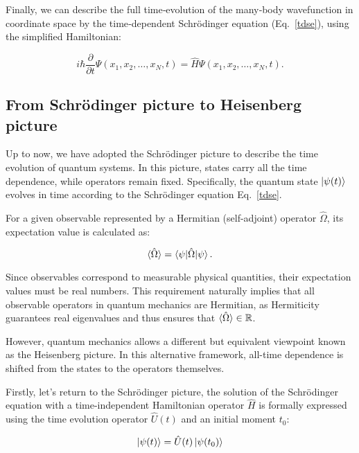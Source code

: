 Finally, we can describe the full time‐evolution of the many‐body wavefunction in coordinate space by the time‐dependent Schrödinger equation (Eq.~\eqref{tdse}), using the simplified Hamiltonian:

\begin{equation}
    i\hbar\frac{\partial}{\partial t}\Psi(x_1,x_2,\dots,x_N,t)
    = \hat{H}\Psi(x_1,x_2,\dots,x_N,t).
    \label{tdse_manybody_coord}
\end{equation}

\subsection{From Schrödinger picture to Heisenberg picture}

Up to now, we have adopted the Schrödinger picture to describe the time evolution of quantum systems. In this picture, states carry all the time dependence, while operators remain fixed. Specifically, the quantum state $\ket{\psi(t)}$ evolves in time according to the Schrödinger equation Eq.~\eqref{tdse}.

For a given observable represented by a Hermitian (self-adjoint) operator $\hat{\Omega}$, its expectation value is calculated as:

\begin{equation}
    \braket{\hat{\Omega}} = \braket{\psi|\hat{\Omega}|\psi}.
    \label{expectation_Hermitian}
\end{equation}

Since observables correspond to measurable physical quantities, their expectation values must be real numbers. This requirement naturally implies that all observable operators in quantum mechanics are Hermitian, as Hermiticity guarantees real eigenvalues and thus ensures that $\braket{\hat{\Omega}}\in \mathbb{R}$.

However, quantum mechanics allows a different but equivalent viewpoint known as the Heisenberg picture. 
In this alternative framework, all-time dependence is shifted from the states to the operators themselves.

Firstly, let's return to the Schrödinger picture, the solution of the Schrödinger equation with a time-independent Hamiltonian operator $\hat{H}$ is formally expressed using the time evolution operator $\hat{U}(t)$ and an initial moment $t_0$:

\begin{equation}
    \ket{\psi(t)}=\hat{U}(t)\ket{\psi(t_0)}
    \label{given_evolution_s}
\end{equation}

